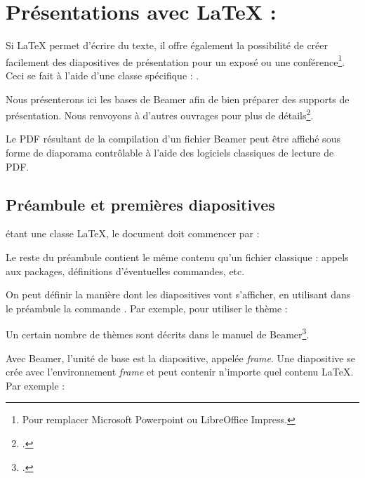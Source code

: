 \chapter{Présentations avec \LaTeX{} : }\label{beamer}

\begin{intro}
Si \LaTeX{} permet d'écrire du texte, il offre également la possibilité de créer facilement des diapositives de présentation pour un exposé ou une conférence\footnote{Pour remplacer Microsoft Powerpoint ou LibreOffice Impress.}. Ceci se fait à l'aide d'une classe spécifique : .

Nous présenterons ici les bases de Beamer afin de bien préparer des supports de présentation. Nous renvoyons à d'autres ouvrages pour plus de détails\footcites[On consultera pour une introduction plus approfondie][]{intro_beamer}[pour les usages avancées on se servira du manuel : ][]{beamer}.

Le PDF résultant de la compilation d'un fichier Beamer peut être affiché sous forme de diaporama contrôlable à l'aide des logiciels classiques de lecture de PDF.
\end{intro}

\section{Préambule et premières diapositives}

 étant une classe \LaTeX{}, le document doit commencer par :


Le reste du préambule contient le même contenu qu'un fichier  classique : appels aux packages, définitions d'éventuelles commandes, etc.

On peut définir la manière dont les diapositives vont s'afficher, en utilisant dans le préambule la commande . Par exemple, pour utiliser le thème  :

\begin{latexcode}
\end{latexcode}

Un certain nombre de thèmes sont décrits dans le manuel de Beamer\footcite{beamer_theme}.

Avec Beamer, l'unité de base  est la diapositive, appelée \textenglish{\emph{frame}}. Une diapositive se crée avec l'environnement \emph{frame} et peut contenir n'importe quel contenu \LaTeX{}.
Par exemple :

